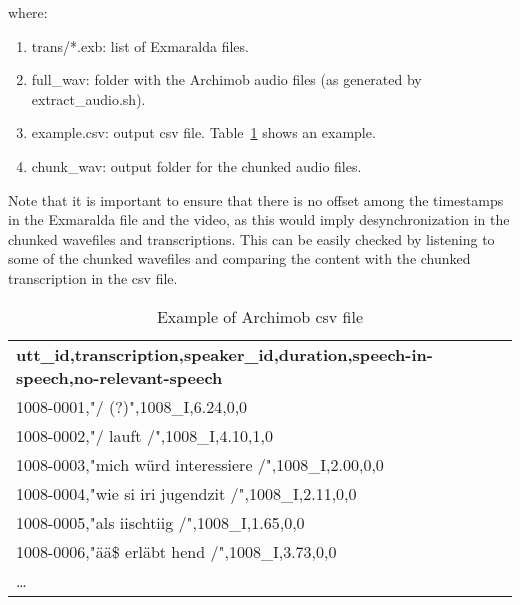 \documentclass[11pt,a4paper,titlepage,twoside]{article}
\begin{document}
\begin{enumerate}
\begin{center}
  \scriptsize
\end{center}

where:

\begin{enumerate}
\item trans/*.exb: list of Exmaralda files.
\item full\_wav: folder with the Archimob audio files (as generated by extract\_audio.sh).
\item example.csv: output csv file. Table~\ref{tab:example-csv} shows an example.
\item chunk\_wav: output folder for the chunked audio files.
\end{enumerate}

\end{enumerate}

Note that it is important to ensure that there is no offset among the timestamps in the Exmaralda file and the video, as this would imply desynchronization in the chunked wavefiles and transcriptions. This can be easily checked by listening to some of the chunked wavefiles and comparing the content with the chunked transcription in the csv file.

\begin{table}[htb!]
  \scriptsize
  \centering
  \begin{tabular}{|l|}
    \hline
      \textbf{utt\_id,transcription,speaker\_id,duration,speech-in-speech,no-relevant-speech} \\
      1008-0001,"/ (?)",1008\_I,6.24,0,0 \\
      1008-0002,"/ lauft /",1008\_I,4.10,1,0 \\
      1008-0003,"mich würd interessiere /",1008\_I,2.00,0,0 \\
      1008-0004,"wie si iri jugendzit /",1008\_I,2.11,0,0 \\
      1008-0005,"als iischtiig /",1008\_I,1.65,0,0 \\
      1008-0006,"ää\$ erläbt hend /",1008\_I,3.73,0,0 \\
      \ldots \\
      \hline
  \end{tabular}
  \caption{Example of Archimob csv file}
  \label{tab:example-csv}
\end{table}
\end{document}
